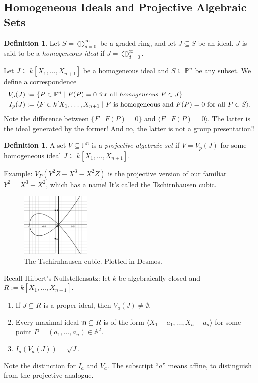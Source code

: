 \documentclass[12pt]{article}
\newcommand{\ita}[1]{\textit{#1}}
\newcommand{\vbrack}[1]{\langle #1\rangle}
\theoremstyle{definition}
\newtheorem{definition}[theorem]{Definition}
\begin{document}
\subsection{Homogeneous Ideals and Projective Algebraic Sets}
\begin{definition}
    Let $S=\bigoplus\limits_{d=0}^{\infty}$ be a graded ring, and let $J\subseteq S$ be an ideal. $J$ is said to be a \ita{homogeneous ideal} if $J=\bigoplus\limits_{d=0}^{\infty}$.
\end{definition}
Let $J\subseteq k[X_1,\dotsc,X_{n+1}]$ be a homogeneous ideal and $S\subseteq\mathbb{P}^n$ be any subset. We define a correspondence
\begin{align}
    V_p(J)&:=\{P\in\mathbb{P}^n\mid F(P)=0\text{ for all \ita{homogeneous}  }F\in J\}\\
    I_p(J)&:=\vbrack{F\in k[X_1,\dotsc,X_{n+1}\mid F\text{ is homogeneous and }F(P)=0\text{ for all }P\in S}.
\end{align}
Note the difference between $\{F\mid F(P)=0\}$ and $\vbrack{F\mid F(P)=0}$. The latter is the ideal generated by the former! And no, the latter is not a group presentation!!
\begin{definition}
    A set $V\subseteq\mathbb{P}^n$ is a \ita{projective algebraic set} if $V=V_p(J)$ for some homogeneous ideal $J\subseteq k[X_1,\dotsc,X_{n+1}]$.
\end{definition}
\underline{Example}: $V_P(Y^2Z-X^3-X^2Z)$ is the projective version of our familiar $Y^2=X^3+X^2$, which has a name! It's called the Tschirnhausen cubic.
\begin{figure}[H]
    \centering
    \includegraphics[width=0.3\textwidth]{30.png}
    \caption{The Tschirnhausen cubic. Plotted in Desmos.}
\end{figure}

Recall Hilbert's Nullstellensatz: let $k$ be algebraically closed and $R:=k[X_1,\dotsc,X_{n+1}]$. 
\begin{enumerate}
    \item If $J\subsetneq R$ is a proper ideal, then $V_a(J)\neq\emptyset$.
    \item Every maximal ideal $\mathfrak{m}\subsetneq R$ is of the form $\vbrack{X_1-a_1,\dotsc,X_n-a_n}$ for some point $P=(a_1,\dotsc,a_n)\in\mathbb{A}^2$.
    \item $I_a(V_a(J))=\sqrt{J}$.
\end{enumerate}
Note the distinction for $I_a$ and $V_a$. The subscript ``$a$'' means affine, to distinguish from the projective analogue.
\end{document}
